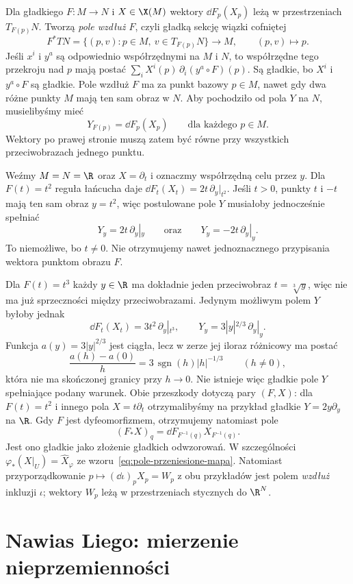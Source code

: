 \begin{uwaga}
Dla gładkiego $F\colon M\to N$ i $X\in\X(M)$ wektory
$\dd F_p(X_p)$ leżą w przestrzeniach $T_{F(p)}N$.
Tworzą \emph{pole wzdłuż $F$}, czyli gładką sekcję wiązki cofniętej
\[
 F^*TN=\{(p,v):p\in M,\ v\in T_{F(p)}N\}\longrightarrow M,
 \qquad(p,v)\longmapsto p.
\]
Jeśli $x^i$ i $y^a$ są odpowiednio współrzędnymi na $M$ i $N$,
to współrzędne tego przekroju nad $p$ mają postać
$\sum_i X^i(p)\,\partial_i(y^a\circ F)(p)$.
Są gładkie, bo $X^i$ i $y^a\circ F$ są gładkie.
Pole wzdłuż $F$ ma za punkt bazowy $p\in M$, nawet gdy dwa różne
punkty $M$ mają ten sam obraz w $N$. Aby pochodziło od pola $Y$ na $N$,
musielibyśmy mieć
\[
 Y_{F(p)}=\dd F_p(X_p)\qquad\text{dla każdego }p\in M.
\]
Wektory po prawej stronie muszą zatem być równe przy wszystkich
przeciwobrazach jednego punktu.

Weźmy $M=N=\R$ oraz $X=\partial_t$ i oznaczmy współrzędną celu przez $y$.
Dla $F(t)=t^2$ reguła łańcucha daje
$\dd F_t(X_t)=2t\,\partial_y|_{t^2}$.
Jeśli $t>0$, punkty $t$ i $-t$ mają ten sam obraz $y=t^2$, więc
postulowane pole $Y$ musiałoby jednocześnie spełniać
\[
 Y_y=2t\,\partial_y|_y
 \qquad\text{oraz}\qquad
 Y_y=-2t\,\partial_y|_y.
\]
To niemożliwe, bo $t\ne0$. Nie otrzymujemy nawet jednoznacznego
przypisania wektora punktom obrazu $F$.

Dla $F(t)=t^3$ każdy $y\in\R$ ma dokładnie jeden przeciwobraz
$t=\sqrt[3]{y}$, więc nie ma już sprzeczności między przeciwobrazami.
Jedynym możliwym polem $Y$ byłoby jednak
\[
 \dd F_t(X_t)=3t^2\,\partial_y|_{t^3},
 \qquad
 Y_y=3|y|^{2/3}\,\partial_y|_y.
\]
Funkcja $a(y)=3|y|^{2/3}$ jest ciągła, lecz w zerze jej iloraz
różnicowy ma postać
\[
 \frac{a(h)-a(0)}{h}
 =3\,\operatorname{sgn}(h)|h|^{-1/3}\qquad(h\ne0),
\]
która nie ma skończonej granicy przy $h\to0$.
Nie istnieje więc gładkie pole $Y$ spełniające podany warunek.
Obie przeszkody dotyczą pary $(F,X)$: dla $F(t)=t^2$ i innego pola
$X=t\partial_t$ otrzymalibyśmy na przykład gładkie
$Y=2y\partial_y$ na $\R$.
Gdy $F$ jest dyfeomorfizmem, otrzymujemy natomiast pole
\[
 (F_*X)_q=\dd F_{F^{-1}(q)}X_{F^{-1}(q)}.
\]
Jest ono gładkie jako złożenie gładkich odwzorowań.
W szczególności $\varphi_*(X|_U)=\widehat X_\varphi$
ze wzoru~\eqref{eq:pole-przeniesione-mapa}.
Natomiast przyporządkowanie
$p\longmapsto(\dd\iota)_pX_p=W_p$ z obu przykładów
jest polem \emph{wzdłuż} inkluzji $\iota$;
wektory $W_p$ leżą w przestrzeniach stycznych do $\R^N$.
\end{uwaga}

\section{Nawias Liego: mierzenie nieprzemienności}
\label{sec:nawias}

